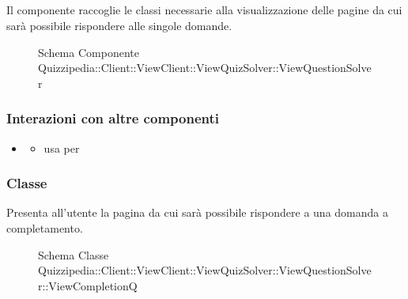 \subsection{}
Il componente raccoglie le classi necessarie alla visualizzazione delle pagine da cui sarà possibile rispondere alle singole domande.
\begin{figure}[H]
\centering
\noindent{}
\caption[Schema Componente Quizzipedia::Client::ViewClient::ViewQuizSolver::ViewQuestionSolver]{Schema Componente Quizzipedia::Client::ViewClient::ViewQuizSolver::ViewQuestionSolver}
\end{figure}
\subsubsection{Interazioni con altre componenti}
\begin{itemize}
\item {}
\begin{itemize}
\item usa  per 
\end{itemize}
\end{itemize}
\subsubsection{Classe }
Presenta all'utente la pagina da cui sarà possibile rispondere a una domanda a completamento.
\begin{figure}[H]
\centering
\noindent{}
\caption[Schema Classe ViewCompletionQ]{Schema Classe Quizzipedia::Client::ViewClient::ViewQuizSolver::ViewQuestionSolver::ViewCompletionQ}
\end{figure}
